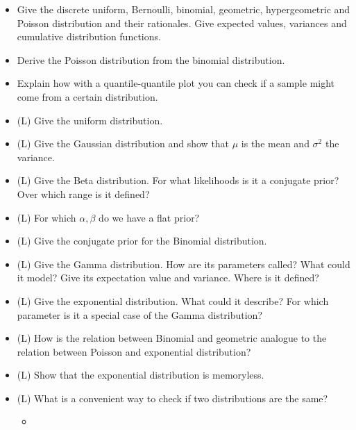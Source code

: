 \begin{itemize}
    \item Give the discrete uniform, Bernoulli, binomial, geometric, hypergeometric and Poisson distribution and their rationales. Give expected values, variances and cumulative distribution functions.
    \item Derive the Poisson distribution from the binomial distribution.
\end{itemize}

\begin{itemize}
    \item Explain how with a quantile-quantile plot you can check if a sample might come from a certain distribution.
\end{itemize}

\begin{itemize}
    \item (L) Give the uniform distribution.
    \item (L) Give the Gaussian distribution and show that $\mu$ is the mean and $\sigma^2$ the variance.
    \item (L) Give the Beta distribution. For what likelihoods is it a conjugate prior? Over which range is it defined?
    \item (L) For which $\alpha, \beta$ do we have a flat prior?
    \item (L) Give the conjugate prior for the Binomial distribution.
    \item (L) Give the Gamma distribution. How are its parameters called? What could it model? Give its expectation value and variance. Where is it defined?
    \item (L) Give the exponential distribution. What could it describe? For which parameter is it a special case of the Gamma distribution?
    \item (L) How is the relation between Binomial and geometric analogue to the relation between Poisson and exponential distribution?
    \item (L) Show that the exponential distribution is memoryless.
    \item (L) What is a convenient way to check if two distributions are the same?
    \begin{itemize}
        \item {}
    \end{itemize}
\end{itemize}

